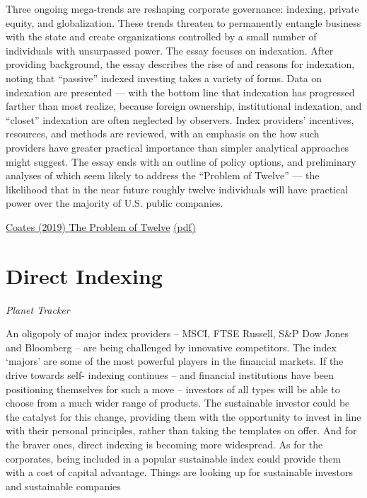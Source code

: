 \documentclass[
]{book}
\begin{document}
Three ongoing mega-trends are reshaping corporate governance: indexing, private equity, and globalization. These trends threaten to permanently entangle business with the state and create organizations controlled by a small number of individuals with unsurpassed power. The essay focuses on indexation. After providing background, the essay describes the rise of and reasons for indexation, noting that ``passive'' indexed investing takes a variety of forms. Data on indexation are presented --- with the bottom line that indexation has progressed farther than most realize, because foreign ownership, institutional indexation, and ``closet'' indexation are often neglected by observers. Index providers' incentives, resources, and methods are reviewed, with an emphasis on the how such providers have greater practical importance than simpler analytical approaches might suggest. The essay ends with an outline of policy options, and preliminary analyses of which seem likely to address the ``Problem of Twelve'' --- the likelihood that in the near future roughly twelve individuals will have practical power over the majority of U.S. public companies.

\href{https://papers.ssrn.com/sol3/papers.cfm?abstract_id=3247337}{Coates (2019) The Problem of Twelve}
\href{pdf/Coates_2019_The_Problem_of_Twelve.pdf}{(pdf)}

\hypertarget{direct-indexing}{%
\section{Direct Indexing}\label{direct-indexing}}

\emph{Planet Tracker}

An oligopoly of major index providers -- MSCI, FTSE Russell, S\&P Dow Jones and
Bloomberg -- are being challenged by innovative competitors. The index `majors' are
some of the most powerful players in the financial markets. If the drive towards self-
indexing continues -- and financial institutions have been positioning themselves for
such a move -- investors of all types will be able to choose from a much wider range of
products.
The sustainable investor could be the catalyst for this change, providing them with
the opportunity to invest in line with their personal principles, rather than taking
the templates on offer. And for the braver ones, direct indexing is becoming more
widespread. As for the corporates, being included in a popular sustainable index could
provide them with a cost of capital advantage. Things are looking up for sustainable
investors and sustainable companies
\end{document}
